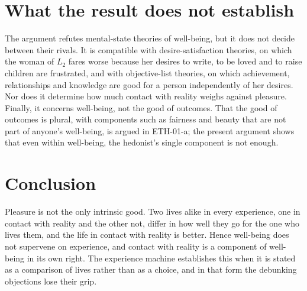\documentclass{situationist-preprint}
\begin{document}
\section{What the result does not establish}

The argument refutes mental-state theories of well-being, but it does not decide between their rivals. It is compatible with desire-satisfaction theories, on which the woman of $L_2$ fares worse because her desires to write, to be loved and to raise children are frustrated, and with objective-list theories, on which achievement, relationships and knowledge are good for a person independently of her desires. Nor does it determine how much contact with reality weighs against pleasure. Finally, it concerns well-being, not the good of outcomes. That the good of outcomes is plural, with components such as fairness and beauty that are not part of anyone's well-being, is argued in ETH-01-a; the present argument shows that even within well-being, the hedonist's single component is not enough.

\section{Conclusion}

Pleasure is not the only intrinsic good. Two lives alike in every experience, one in contact with reality and the other not, differ in how well they go for the one who lives them, and the life in contact with reality is better. Hence well-being does not supervene on experience, and contact with reality is a component of well-being in its own right. The experience machine establishes this when it is stated as a comparison of lives rather than as a choice, and in that form the debunking objections lose their grip.
\end{document}
